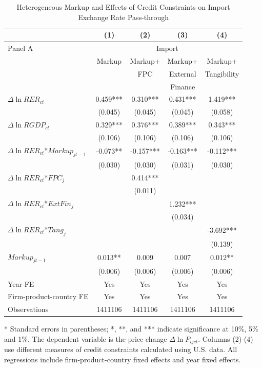 \documentclass[12pt]{article}
\begin{document}
\begin{table}[htbp]
	\centering
	\caption{Heterogeneous Markup and Effects of Credit Constraints on Import Exchange Rate Pass-through}
	\begin{threeparttable}
		\begin{tabular}{lcccc}
			\midrule          & (1)   & (2)   & (3)   & (4)     \\
			\midrule
			Panel A & \multicolumn{4}{c}{Import} \\
			& Markup & Markup+& Markup+ & Markup+      \\
			&       & FPC & External & Tangibility        \\
			&       & & Finance &  	          \\
			\midrule
			$\Delta \ln RER_{ct}$ & 0.459*** & 0.310*** & 0.431*** & 1.419***   \\
			& (0.045) & (0.045) & (0.045) & (0.058) \\
			$\Delta \ln RGDP_{ct}$ & 0.329*** & 0.376*** & 0.389*** & 0.343*** \\
			& (0.106) & (0.106) & (0.106) & (0.106)  \\
			$\Delta \ln RER_{ct}$*$Markup_{jt-1}$ & -0.073** & -0.157*** & -0.163*** & -0.112*** \\
			& (0.030) & (0.030) & (0.031) & (0.030) \\
			$\Delta \ln RER_{ct}$*$FPC_{j}$ &       & 0.414*** &       &  \\
			&       & (0.011) &       &   \\
			$\Delta \ln RER_{ct}$*$ExtFin_{j}$ &       &       & 1.232*** &  \\
			&       &       & (0.034) &   \\
			$\Delta \ln RER_{ct}$*$Tang_{j}$  &       &       &       & -3.692*** \\
			&       &       &       & (0.139) \\
			$Markup_{jt-1}$ & 0.013** & 0.009 & 0.007 & 0.012**  \\
			& (0.006) & (0.006) & (0.006) & (0.006)  \\
			Year FE  & Yes   & Yes   & Yes   & Yes       \\
			Firm-product-country FE & Yes   & Yes   & Yes   & Yes       \\
			Observations & 1411106 & 1411106 & 1411106 & 1411106  \\
			\bottomrule
		\end{tabular}
		\begin{tablenotes}
			\footnotesize
			\item[*] Standard errors in parentheses; *, **, and *** indicate significance at 10\%, 5\% and 1\%. The dependent variable is the price change $\Delta \ln P_{ijct}$. Columns (2)-(4) use different measures of credit constraints calculated using U.S. data. All regressions include firm-product-country fixed effects and year fixed effects.
		\end{tablenotes}
	\end{threeparttable}
        \label{tab.markup}
\end{table}
\end{document}
